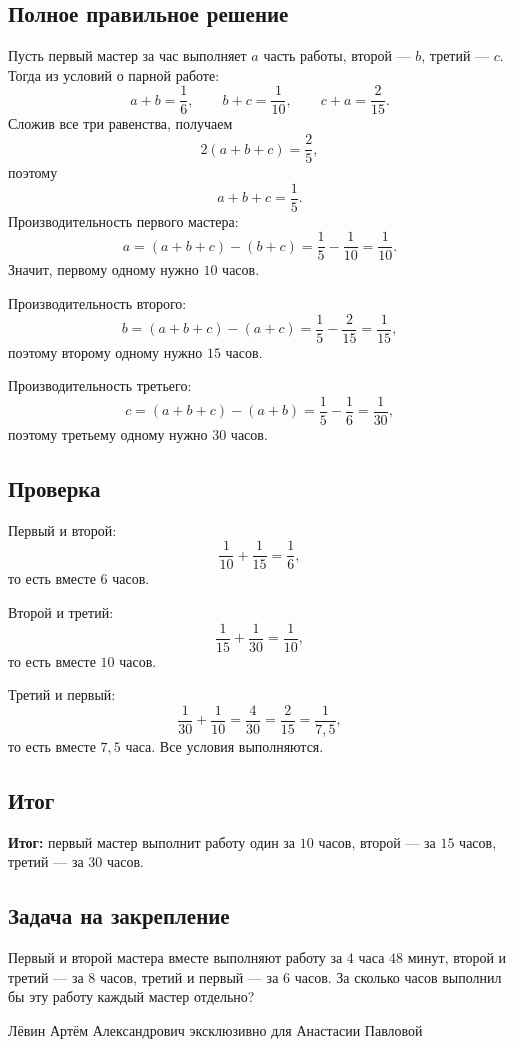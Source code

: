\documentclass[12pt,a4paper]{article}
\newcommand{\result}{\textcolor{teal!60!black}{\textbf{Итог:}}}
\begin{document}
\subsection*{Полное правильное решение}
Пусть первый мастер за час выполняет $a$ часть работы, второй --- $b$, третий --- $c$. Тогда из условий о парной работе:
\[
a+b=\frac16,\qquad b+c=\frac1{10},\qquad c+a=\frac2{15}.
\]
Сложив все три равенства, получаем
\[
2(a+b+c)=\frac25,
\]
поэтому
\[
a+b+c=\frac15.
\]
Производительность первого мастера:
\[
a=(a+b+c)-(b+c)=\frac15-\frac1{10}=\frac1{10}.
\]
Значит, первому одному нужно $10$ часов.

Производительность второго:
\[
b=(a+b+c)-(a+c)=\frac15-\frac2{15}=\frac1{15},
\]
поэтому второму одному нужно $15$ часов.

Производительность третьего:
\[
c=(a+b+c)-(a+b)=\frac15-\frac16=\frac1{30},
\]
поэтому третьему одному нужно $30$ часов.

\subsection*{Проверка}
Первый и второй:
\[
\frac1{10}+\frac1{15}=\frac16,
\]
то есть вместе $6$ часов.

Второй и третий:
\[
\frac1{15}+\frac1{30}=\frac1{10},
\]
то есть вместе $10$ часов.

Третий и первый:
\[
\frac1{30}+\frac1{10}=\frac4{30}=\frac2{15}=\frac1{7{,}5},
\]
то есть вместе $7{,}5$ часа. Все условия выполняются.

\subsection*{Итог}
\result{} первый мастер выполнит работу один за $10$ часов, второй --- за $15$ часов, третий --- за $30$ часов.

\subsection*{Задача на закрепление}
Первый и второй мастера вместе выполняют работу за $4$ часа $48$ минут, второй и третий --- за $8$ часов, третий и первый --- за $6$ часов. За сколько часов выполнил бы эту работу каждый мастер отдельно?

\vfill
\begin{center}
\small Лёвин Артём Александрович эксклюзивно для Анастасии Павловой
\end{center}
\end{document}
